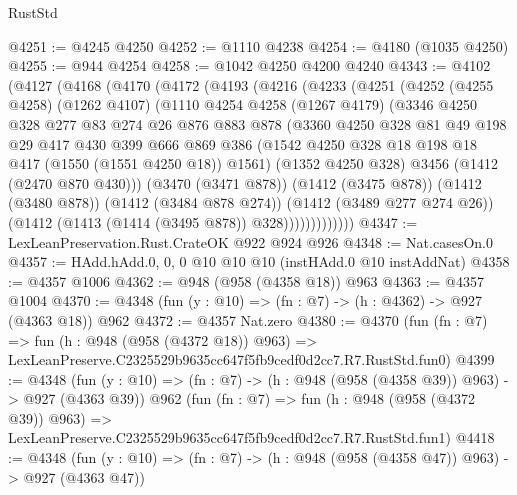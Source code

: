 \begin{lexlean}{RustStd}
\begin{coremodule}
@4251 := @4245 @4250
@4252 := @1110 @4238
@4254 := @4180 (@1035 @4250)
@4255 := @944 @4254
@4258 := @1042 @4250 @4200 @4240
@4343 := @4102
    (@4127
      (@4168
        (@4170
          (@4172
            (@4193
              (@4216
                (@4233
                  (@4251
                    (@4252
                      (@4255 @4258)
                      (@1262 @4107)
                      (@1110
                        @4254
                        @4258
                        (@1267 @4179)
                        (@3346
                          @4250
                          @328
                          @277
                          @83
                          @274
                          @26
                          @876
                          @883
                          @878
                          (@3360
                            @4250
                            @328
                            @81
                            @49
                            @198
                            @29
                            @417
                            @430
                            @399
                            @666
                            @869
                            @386
                            (@1542 @4250 @328 @18 @198 @18 @417 (@1550 (@1551 @4250 @18)) @1561)
                            (@1352 @4250 @328)
                            @3456
                            (@1412 (@2470 @870 @430)))
                          (@3470 (@3471 @878))
                          (@1412 (@3475 @878))
                          (@1412 (@3480 @878))
                          (@1412 (@3484 @878 @274))
                          (@1412 (@3489 @277 @274 @26))
                          (@1412 (@1413 (@1414 (@3495 @878)) @328)))))))))))))
@4347 := LexLeanPreservation.Rust.CrateOK @922 @924 @926
@4348 := Nat.casesOn.{0}
@4357 := HAdd.hAdd.{0, 0, 0} @10 @10 @10 (instHAdd.{0} @10 instAddNat)
@4358 := @4357 @1006
@4362 := @948 (@958 (@4358 @18)) @963
@4363 := @4357 @1004
@4370 := @4348 (fun (y : @10) => (fn : @7) -> (h : @4362) -> @927 (@4363 @18)) @962
@4372 := @4357 Nat.zero
@4380 := @4370
    (fun (fn : @7) =>
    fun (h : @948 (@958 (@4372 @18)) @963) =>
    LexLeanPreserve.C2325529b9635cc647f5fb9cedf0d2cc7.R7.RustStd.fun0)
@4399 := @4348
    (fun (y : @10) => (fn : @7) -> (h : @948 (@958 (@4358 @39)) @963) -> @927 (@4363 @39))
    @962
    (fun (fn : @7) =>
    fun (h : @948 (@958 (@4372 @39)) @963) =>
    LexLeanPreserve.C2325529b9635cc647f5fb9cedf0d2cc7.R7.RustStd.fun1)
@4418 := @4348
    (fun (y : @10) => (fn : @7) -> (h : @948 (@958 (@4358 @47)) @963) -> @927 (@4363 @47))

\end{coremodule}
\end{lexlean}

